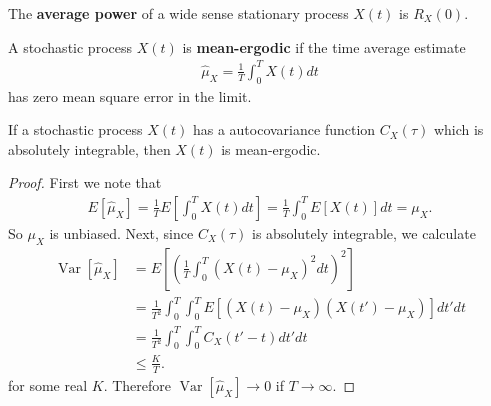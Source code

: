 \documentclass{memoir}
\newcommand{\Var}{\operatorname{Var}}
\begin{document}
\begin{definition}
    The \textbf{average power} of a wide sense stationary process $X(t)$ is $R_X(0)$.
\end{definition}

\begin{definition}
    A stochastic process $X(t)$ is \textbf{mean-ergodic} if the time average estimate
    \begin{align*}
        \hat{\mu}_X = \frac{1}{T} \int_0^T X(t) dt
    \end{align*}
    has zero mean square error in the limit.
\end{definition}

\begin{theorem}
    If a stochastic process $X(t)$ has a autocovariance function $C_X(\tau)$ which is absolutely integrable, then $X(t)$ is mean-ergodic.
\end{theorem}
\begin{proof}
    First we note that
    \begin{align*}
        E[\hat{\mu}_X] = \frac{1}{T} E\left[\int_0^T X(t) dt\right] = \frac{1}{T} \int_0^T E[X(t)] dt= \mu_X.
    \end{align*}
    So $\mu_X$ is unbiased. Next, since $C_X(\tau)$ is absolutely integrable, we calculate
    \begin{align*}
        \Var[\hat{\mu}_X] &= E\left[\left(\frac{1}{T}\int_0^T (X(t) - \mu_X)^2 dt\right)^2\right] \\
        &= \frac{1}{T^2} \int_0^T \int_0^T E[(X(t)-\mu_X)(X(t')-\mu_X)]dt' dt \\
        &= \frac{1}{T^2} \int_0^T \int_0^T C_X(t' - t)dt' dt \\
        &\le \frac{K}{T}.
    \end{align*}
    for some real $K$. Therefore $\Var[\hat{\mu}_X] \to 0$ if $T \to \infty$.
\end{proof}
\end{document}
